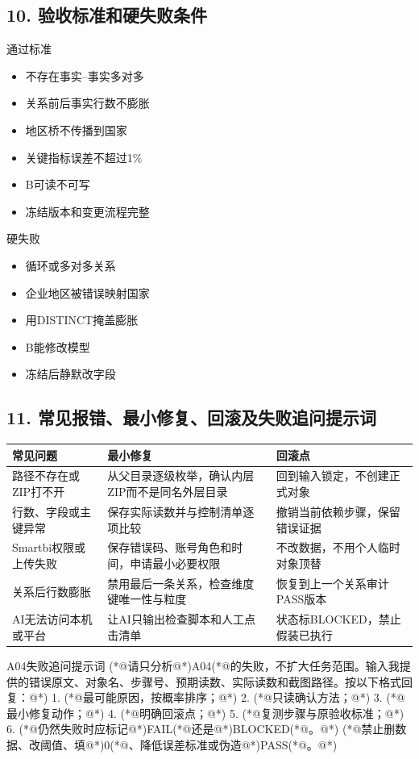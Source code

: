 \documentclass[UTF8,openany,zihao=-4]{ctexbook}
\renewcommand{\_}{\textunderscore\allowbreak}
\begin{document}
\subsection*{10. 验收标准和硬失败条件}
\begin{statusbox}{通过标准}
\begin{itemize}[label=$\square$]
\item 不存在事实--事实多对多
\item 关系前后事实行数不膨胀
\item 地区桥不传播到国家
\item 关键指标误差不超过1\%
\item B可读不可写
\item 冻结版本和变更流程完整
\end{itemize}
\end{statusbox}
\begin{dangerbox}{硬失败}
\begin{itemize}
\item 循环或多对多关系
\item 企业地区被错误映射国家
\item 用DISTINCT掩盖膨胀
\item B能修改模型
\item 冻结后静默改字段
\end{itemize}
\end{dangerbox}

\subsection*{11. 常见报错、最小修复、回滚及失败追问提示词}
\noindent\begin{tabularx}{\textwidth}{@{}p{}XX@{}}
\toprule
\textbf{常见问题} & \textbf{最小修复} & \textbf{回滚点} \\
\midrule
路径不存在或ZIP打不开 & 从父目录逐级枚举，确认内层ZIP而不是同名外层目录 & 回到输入锁定，不创建正式对象 \\
行数、字段或主键异常 & 保存实际读数并与控制清单逐项比较 & 撤销当前依赖步骤，保留错误证据 \\
Smartbi权限或上传失败 & 保存错误码、账号角色和时间，申请最小必要权限 & 不改数据，不用个人临时对象顶替 \\
关系后行数膨胀 & 禁用最后一条关系，检查维度键唯一性与粒度 & 恢复到上一个关系审计PASS版本 \\
AI无法访问本机或平台 & 让AI只输出检查脚本和人工点击清单 & 状态标BLOCKED，禁止假装已执行 \\
\bottomrule
\end{tabularx}
\begin{PromptBox}{A04失败追问提示词}
(*@{\promptcjk 请只分析}@*)A04(*@{\promptcjk 的失败，不扩大任务范围。输入我提供的错误原文、对象名、步骤号、预期读数、实际读数和截图路径。按以下格式回复：}@*)
1. (*@{\promptcjk 最可能原因，按概率排序；}@*)
2. (*@{\promptcjk 只读确认方法；}@*)
3. (*@{\promptcjk 最小修复动作；}@*)
4. (*@{\promptcjk 明确回滚点；}@*)
5. (*@{\promptcjk 复测步骤与原验收标准；}@*)
6. (*@{\promptcjk 仍然失败时应标记}@*)FAIL(*@{\promptcjk 还是}@*)BLOCKED(*@{\promptcjk 。}@*)
(*@{\promptcjk 禁止删数据、改阈值、填}@*)0(*@{\promptcjk 、降低误差标准或伪造}@*)PASS(*@{\promptcjk 。}@*)
\end{PromptBox}
\end{document}

